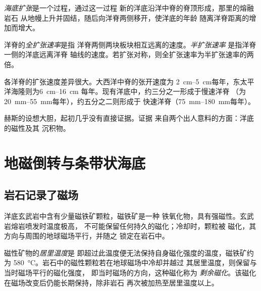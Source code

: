 \begin{definition}[海底扩张]\label{def:g11:drift-to-spreading:spreading}
\emph{海底扩张}是一个过程，通过这一过程
新的洋底沿洋中脊的脊顶形成，那里的熔融岩石
从地幔上升并固结，随后向洋脊两侧移开，使洋底的年龄
随离洋脊距离的增加而增大。
\end{definition}

\begin{definition}[扩张速率]\label{def:g11:drift-to-spreading:spreading-rate}
洋脊的\emph{全扩张速率}是指
洋脊两侧两块板块相互远离的速度。\emph{半扩张速率}
是指洋脊一侧的洋底远离洋脊
轴线的速度。若扩张对称，则全扩张速率为半扩张速率的两倍。
\end{definition}

各洋脊的扩张速度差异很大。大西洋中脊的张开速度为
\qtyrange{2}{5}{cm}每年，东太平洋海隆则为\qtyrange{6}{16}{cm}
每年。现有洋底中，约三分之一形成于慢速洋脊
（为\qtyrange{20}{55}{mm}每年），约五分之二则形成于
快速洋脊（\qtyrange{75}{180}{mm}每年）。

赫斯的设想大胆，起初几乎没有直接证据。证据
来自两个出人意料的方面：洋底的磁性及其
沉积物。

\section{地磁倒转与条带状海底}

\subsection{岩石记录了磁场}

洋底玄武岩中含有少量磁铁矿颗粒，磁铁矿是一种
铁氧化物，具有强磁性。玄武岩熔岩喷发时温度极高，
不可能保留任何持久的磁化；冷却时，颗粒被
磁化，其方向与周围的地球磁场平行，并随之
锁定在岩石中。

\begin{definition}\label{def:g11:drift-to-spreading:remanence}
磁性矿物的\emph{居里温度}是
即超过此温度便无法保持自身磁化强度的温度，磁铁矿约为
\qty{580}{\celsius}。岩石中的磁性颗粒若在地球磁场中冷却并越过
其居里温度，则保留与当时磁场平行的磁化强度，
即当时磁场的方向，这种磁化称为
\emph{剩余磁化}。该磁化在磁场改变后仍能长期保持，除非岩石
再次被加热至居里温度以上。
\end{definition}

